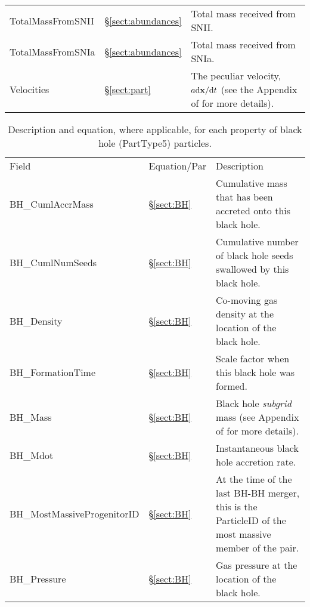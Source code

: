 \documentclass[10pt, a4paper]{article}
\newcommand{\velocity}{The peculiar velocity, $a{\rm d}{\bf x}/{\rm d}t$ (see
the Appendix of \cite{mcalpine2016} for more details).}
\begin{document}
\begin{table}
\begin{center}
\begin{tabular}{>{\ttfamily}p{4cm}p{1.5cm}p{11cm}}
TotalMassFromSNII &
\S\ref{sect:abundances} &
Total mass received from SNII. \\

TotalMassFromSNIa &
\S\ref{sect:abundances} &
Total mass received from SNIa. \\

Velocities &
\S\ref{sect:part}& \velocity \\

\hline
\end{tabular}
\end{center}
\end{table}

\begin{table}
\label{table:bh}
\caption{Description and equation, where applicable, for each property of black hole
(PartType5) particles.}
\begin{center}
\footnotesize
\renewcommand{\arraystretch}{1.5}
\begin{tabular}{>{\ttfamily}p{4cm}p{1.5cm}p{11cm}}
\multicolumn{3}{l}{\large \bf PartType5: Black Holes} \\
\hline
Field & Equation/Par & Description \\ \hline\hline

BH\_CumlAccrMass &
\S\ref{sect:BH} &
Cumulative mass that has been accreted onto this black hole.  \\

BH\_CumlNumSeeds &
\S\ref{sect:BH} &
Cumulative number of black hole seeds swallowed by this black hole. \\

BH\_Density &
\S\ref{sect:BH} &
Co-moving gas density at the location of the black hole. \\

BH\_FormationTime &
\S\ref{sect:BH} &
Scale factor when this black hole was formed. \\

BH\_Mass &
\S\ref{sect:BH} &
Black hole \textit{subgrid} mass (see Appendix of \cite{mcalpine2016} for more details). \\

BH\_Mdot &
\S\ref{sect:BH} &
Instantaneous black hole accretion rate. \\

BH\_MostMassiveProgenitorID &
\S\ref{sect:BH} &
At the time of the last BH-BH merger, this is the ParticleID of the most massive member of the pair. \\

BH\_Pressure &
\S\ref{sect:BH} &
Gas pressure at the location of the black hole. \\


\end{tabular}
\end{center}
\end{table}
\end{document}

